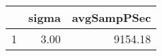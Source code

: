 \begin{table}[h]
\centering
\begin{tabular}{rrr}
  \hline
 & sigma & avgSampPSec \\ 
  \hline
1 & 3.00 & 9154.18 \\ 
   \hline
\end{tabular}
\end{table}
